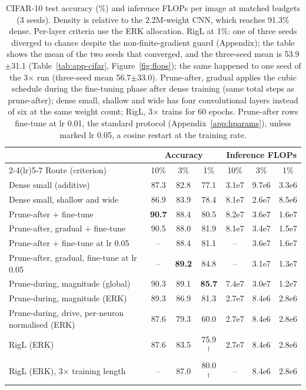\documentclass[11pt]{article}
\begin{document}
\begin{table}[t]
\centering\small
\caption{CIFAR-10 test accuracy (\%) and inference FLOPs per image at matched budgets (3 seeds). Density is relative to the
2.2M-weight CNN, which reaches 91.3\% dense. Per-layer criteria use the ERK allocation. RigL at 1\%: one of three seeds
diverged to chance despite the non-finite-gradient guard (Appendix); the table shows the mean of the two seeds that converged,
and the three-seed mean is 53.9$\pm$31.1 (Table~\ref{tab:app-cifar}, Figure~\ref{fig:flops}); the same happened to one seed
of the 3$\times$ run (three-seed mean 56.7$\pm$33.0). Prune-after, gradual applies the cubic schedule during the fine-tuning
phase after dense training (same total steps as prune-after); dense small, shallow and wide has four convolutional layers
instead of six at the same weight count; RigL, 3$\times$ trains for 60 epochs. Prune-after rows fine-tune at lr 0.01, the
standard protocol (Appendix~\ref{app:hparams}), unless marked lr 0.05, a cosine restart at the training rate.}
\label{tab:cifar}
\begin{tabular}{lcccccc}
\toprule
 & \multicolumn{3}{c}{Accuracy} & \multicolumn{3}{c}{Inference FLOPs} \\
\cmidrule(lr){2-4}\cmidrule(lr){5-7}
Route (criterion) & 10\% & 3\% & 1\% & 10\% & 3\% & 1\% \\
\midrule
Dense small (additive)             & 87.3 & 82.8 & 77.1 & 3.1e7 & 9.7e6 & 3.3e6 \\
Dense small, shallow and wide      & 86.9 & 83.9 & 78.4 & 8.1e7 & 2.6e7 & 8.5e6 \\
Prune-after + fine-tune            & \textbf{90.7} & 88.4 & 80.5 & 8.2e7 & 3.6e7 & 1.6e7 \\
Prune-after, gradual + fine-tune   & 90.5 & 88.0 & 81.9 & 8.1e7 & 3.4e7 & 1.5e7 \\
Prune-after + fine-tune at lr 0.05 & --   & 88.4 & 81.1 & --    & 3.6e7 & 1.6e7 \\
Prune-after, gradual, fine-tune at lr 0.05 & -- & \textbf{89.2} & 84.8 & -- & 3.1e7 & 1.3e7 \\
Prune-during, magnitude (global)   & 90.3 & 89.1 & \textbf{85.7} & 7.4e7 & 3.0e7 & 1.2e7 \\
Prune-during, magnitude (ERK)      & 89.3 & 86.9 & 81.3 & 2.7e7 & 8.4e6 & 2.8e6 \\
Prune-during, drive, per-neuron normalised (ERK) & 87.6 & 79.3 & 60.0 & 2.7e7 & 8.4e6 & 2.8e6 \\
RigL (ERK)                         & 87.6 & 83.5 & 75.9$^\dagger$ & 2.7e7 & 8.4e6 & 2.8e6 \\
RigL (ERK), 3$\times$ training length & --   & 87.0 & 80.0$^\dagger$ & --    & 8.4e6 & 2.8e6 \\
\bottomrule
\end{tabular}
\end{table}
\end{document}
